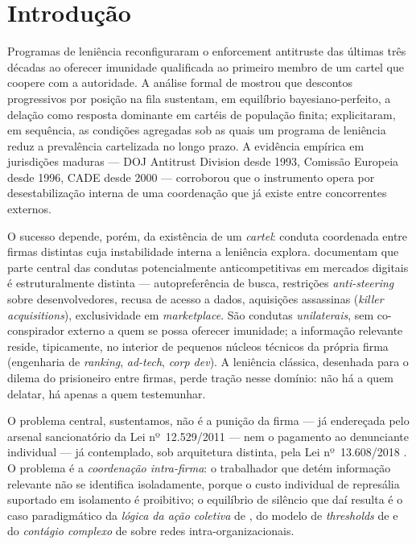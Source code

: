 \documentclass[12pt,a4paper]{article}
\begin{document}
\begin{abstract}
\end{abstract}

\section{Introdução}

Programas de leniência reconfiguraram o enforcement antitruste das últimas três décadas ao oferecer imunidade qualificada ao primeiro membro de um cartel que coopere com a autoridade. A análise formal de \citet{spagnolo2004divide} mostrou que descontos progressivos por posição na fila sustentam, em equilíbrio bayesiano-perfeito, a delação como resposta dominante em cartéis de população finita; \citet{harrington2015when} explicitaram, em sequência, as condições agregadas sob as quais um programa de leniência reduz a prevalência cartelizada no longo prazo. A evidência empírica em jurisdições maduras --- DOJ Antitrust Division desde 1993, Comissão Europeia desde 1996, CADE desde 2000 --- corroborou que o instrumento opera por desestabilização interna de uma coordenação que já existe entre concorrentes externos.

O sucesso depende, porém, da existência de um \emph{cartel}: conduta coordenada entre firmas distintas cuja instabilidade interna a leniência explora. \citet{cremer2019competition} documentam que parte central das condutas potencialmente anticompetitivas em mercados digitais é estruturalmente distinta --- autopreferência de busca, restrições \emph{anti-steering} sobre desenvolvedores, recusa de acesso a dados, aquisições assassinas (\emph{killer acquisitions}), exclusividade em \emph{marketplace}. São condutas \emph{unilaterais}, sem co-conspirador externo a quem se possa oferecer imunidade; a informação relevante reside, tipicamente, no interior de pequenos núcleos técnicos da própria firma (engenharia de \emph{ranking}, \emph{ad-tech}, \emph{corp dev}). A leniência clássica, desenhada para o dilema do prisioneiro entre firmas, perde tração nesse domínio: não há a quem delatar, há apenas a quem testemunhar.

O problema central, sustentamos, não é a punição da firma --- já endereçada pelo arsenal sancionatório da Lei nº~12.529/2011 --- nem o pagamento ao denunciante individual --- já contemplado, sob arquitetura distinta, pela Lei nº~13.608/2018 \citep{lei13608}. O problema é a \emph{coordenação intra-firma}: o trabalhador que detém informação relevante não se identifica isoladamente, porque o custo individual de represália suportado em isolamento é proibitivo; o equilíbrio de silêncio que daí resulta é o caso paradigmático da \emph{lógica da ação coletiva} de \citet{olson1965logic}, do modelo de \emph{thresholds} de \citet{granovetter1978threshold} e do \emph{contágio complexo} de \citet{centola2007complex} sobre redes intra-organizacionais.
\end{document}
